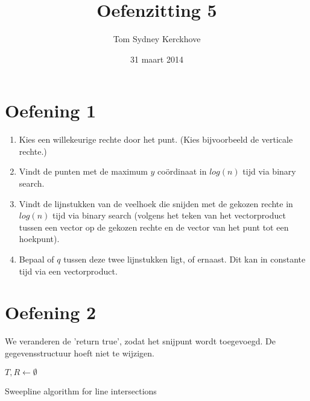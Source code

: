 \documentclass[10pt,a4paper]{article}
\title{Oefenzitting 5}
\author{Tom Sydney Kerckhove}
\date{31 maart 2014}
\begin{document}
\maketitle


\section*{Oefening 1}
\begin{enumerate}
\item Kies een willekeurige rechte door het punt. (Kies bijvoorbeeld de verticale rechte.)
\item Vindt de punten met de maximum $y$ co\"ordinaat in $log(n)$ tijd via binary search.
\item Vindt de lijnstukken van de veelhoek die snijden met de gekozen rechte in $log(n)$ tijd via binary search (volgens het teken van het vectorproduct tussen een vector op de gekozen rechte en de vector van het punt tot een hoekpunt).
\item Bepaal of $q$ tussen deze twee lijnstukken ligt, of ernaast. Dit kan in constante tijd via een vectorproduct.
\end{enumerate}

\section*{Oefening 2}
We veranderen de 'return true', zodat het snijpunt wordt toegevoegd. De gegevensstructuur hoeft niet te wijzigen.\\
\begin{algorithm}[H]
 $T,R \leftarrow \emptyset$\\
 \caption{Sweepline algorithm for line intersections}
\end{algorithm}


\end{document}
